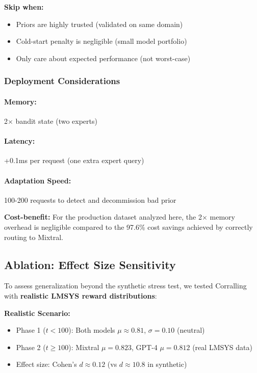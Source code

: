 \textbf{Skip when:}
\begin{itemize}
    \item Priors are highly trusted (validated on same domain)
    \item Cold-start penalty is negligible (small model portfolio)
    \item Only care about expected performance (not worst-case)
\end{itemize}

\subsubsection{Deployment Considerations}

\paragraph{Memory:} 2$\times$ bandit state (two experts)
\paragraph{Latency:} +0.1ms per request (one extra expert query)
\paragraph{Adaptation Speed:} 100-200 requests to detect and decommission bad prior

\textbf{Cost-benefit:} For the production dataset analyzed here, the 2$\times$ memory overhead is negligible compared to the 97.6\% cost savings achieved by correctly routing to Mixtral.

\subsection{Ablation: Effect Size Sensitivity}

To assess generalization beyond the synthetic stress test, we tested Corralling with \textbf{realistic LMSYS reward distributions}:

\textbf{Realistic Scenario:}
\begin{itemize}
    \item Phase 1 ($t<100$): Both models $\mu \approx 0.81$, $\sigma=0.10$ (neutral)
    \item Phase 2 ($t \geq 100$): Mixtral $\mu=0.823$, GPT-4 $\mu=0.812$ (real LMSYS data)
    \item Effect size: Cohen's $d \approx 0.12$ (vs $d \approx 10.8$ in synthetic)
\end{itemize}

